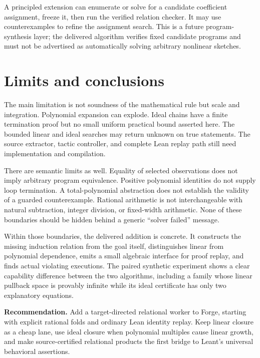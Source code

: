 \documentclass[11pt,letterpaper]{article}
\theoremstyle{definition}
\begin{document}
A principled extension can enumerate or solve for a candidate coefficient
assignment, freeze it, then run the verified relation checker. It may use
counterexamples to refine the assignment search. This is a future
program-synthesis layer; the delivered algorithm verifies fixed candidate
programs and must not be advertised as automatically solving arbitrary nonlinear
sketches.

\section{Limits and conclusions}
\label{sec:conclusion}

The main limitation is not soundness of the mathematical rule but scale and
integration. Polynomial expansion can explode. Ideal chains have a finite
termination proof but no small uniform practical bound asserted here. The
bounded linear and ideal searches may return unknown on true statements.
The source extractor, tactic controller, and complete Lean replay path still
need implementation and compilation.

There are semantic limits as well. Equality of selected observations does not
imply arbitrary program equivalence. Positive polynomial identities do not
supply loop termination. A total-polynomial abstraction does not establish the
validity of a guarded counterexample. Rational arithmetic is not interchangeable
with natural subtraction, integer division, or fixed-width arithmetic. None of
these boundaries should be hidden behind a generic ``solver failed'' message.

Within those boundaries, the delivered addition is concrete. It constructs the
missing induction relation from the goal itself, distinguishes linear from
polynomial dependence, emits a small algebraic interface for proof replay, and
finds actual violating executions. The paired synthetic experiment shows a
clear capability difference between the two algorithms, including a family
whose linear pullback space is provably infinite while its ideal certificate
has only two explanatory equations.

\begin{focusbox}
\textbf{Recommendation.} Add a target-directed relational worker to Forge,
starting with explicit rational folds and ordinary Lean identity replay. Keep
linear closure as a cheap lane, use ideal closure when polynomial multiples
cause linear growth, and make source-certified relational products the first
bridge to Leant's universal behavioral assertions.
\end{focusbox}
\end{document}
